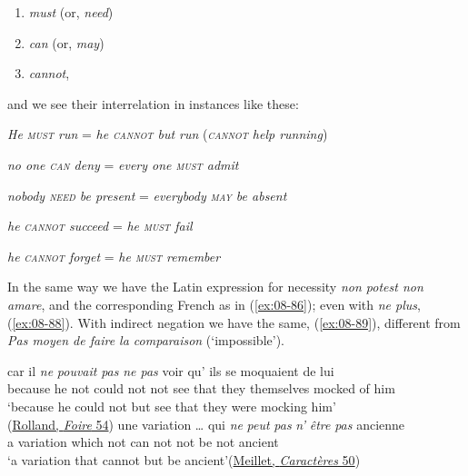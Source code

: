 \begin{enumerate}[label=\Alph*., noitemsep]
\item \textit{must} (or, \textit{need})
\item \textit{can} (or, \textit{may})
\item \textit{cannot},
\end{enumerate}

\noindent and we see their interrelation in instances like these:

\bigskip

\textit{He \textsc{must} run} = \textit{he \textsc{cannot} but run} (\textit{\textsc{cannot} help running})

\textit{no one \textsc{can} deny} = \textit{every one \textsc{must} admit}

\textit{nobody \textsc{need} be present} = \textit{everybody \textsc{may} be absent}

\textit{he \textsc{cannot} succeed} = \textit{he \textsc{must} fail}

\textit{he \textsc{cannot} forget} = \textit{he \textsc{must} remember}

\bigskip

In the same way we have the Latin expression for necessity \textit{non potest non amare}, and the corresponding French as in (\ref{ex:08-86}); even with \textit{ne plus}, (\ref{ex:08-88}). With indirect negation we have the same, (\ref{ex:08-89}), different from \textit{Pas moyen de faire la comparaison} (`impossible').

\ea \label{ex:08-86}
\ea
\gll car il \emph{ne} \emph{pouvait} \emph{pas} \emph{ne pas} voir qu' ils se moquaient de lui\\
 because he not could not not see that they themselves mocked of him\\
\glt `because he could not but see that they were mocking him'\\\hfill(\href{https://www.gutenberg.org/cache/epub/61876/pg61876-images.html}{Rolland, \textit{Foire} 54})
\ex
\gll une variation {\dots} qui \emph{ne} \emph{peut} \emph{pas} \emph{n'} \emph{être} \emph{pas} ancienne\\
 a variation {} which not can not not be not ancient\\
\glt `a variation that cannot but be ancient'\hfill(\href{https://archive.org/details/caractresgn00meiluoft/page/50/mode/2up?q=%22n%27%C3%AAtre+pas+ancienne%22&view=theater}{Meillet, \textit{Caractères} 50})
\z
\z

